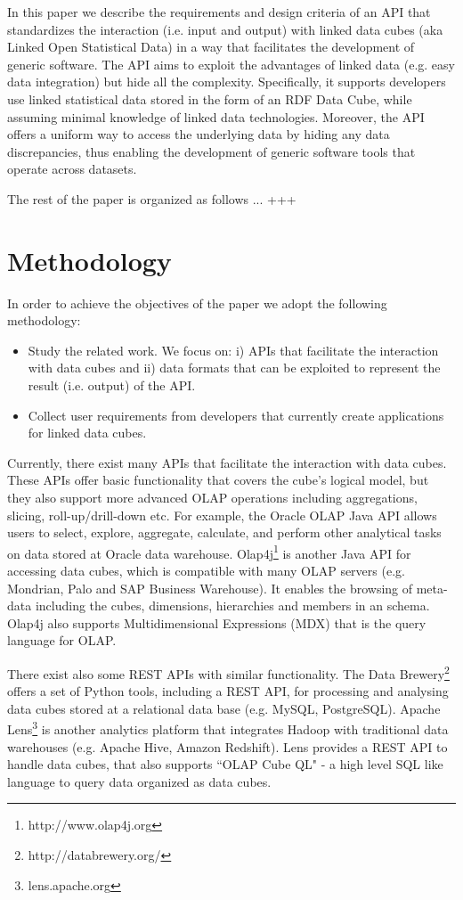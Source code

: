 \documentclass{llncs}
\begin{document}
In this paper we describe the requirements and design criteria of an API that standardizes the interaction (i.e. input and output) with linked data cubes (aka Linked Open Statistical Data) in a way that facilitates the development of generic software. The API aims to exploit the advantages of linked data (e.g. easy data integration) but hide all the complexity. Specifically, it supports developers use linked statistical data stored in the form of an RDF Data Cube, while assuming minimal knowledge of linked data technologies. Moreover, the API offers a uniform way to access the underlying data by hiding any data discrepancies, thus enabling the development of generic software tools that operate across datasets. 

The rest of the paper is organized as follows ... +++

\section{Methodology}\label{sec:methodology}

In order to achieve the objectives of the paper we adopt the following methodology:
\begin{itemize}
\item Study the related work. We focus on: i) APIs that facilitate the interaction with data cubes and ii) data formats that can be exploited to represent the result (i.e. output) of the API. 
\item Collect user requirements from developers that currently create applications for linked data cubes. 
\end{itemize}

Currently, there exist many APIs that facilitate the interaction with data cubes. These APIs offer basic functionality that covers the cube's logical model, but they also support more advanced OLAP operations including aggregations, slicing, roll-up/drill-down etc. For example, the Oracle OLAP Java API \cite{ORACLEAPI} allows users to select, explore, aggregate, calculate, and perform other analytical tasks on data stored at Oracle data warehouse. Olap4j\footnote{http://www.olap4j.org} is another Java API for accessing data cubes, which is compatible with many OLAP servers (e.g. Mondrian, Palo and SAP Business Warehouse). It enables the browsing of meta-data including the cubes, dimensions, hierarchies and members in an schema. Olap4j also supports Multidimensional Expressions (MDX) that is the query language for OLAP.

There exist also some REST APIs with similar functionality. The Data Brewery\footnote{http://databrewery.org/} offers a set of Python tools, including a REST API, for processing and analysing data cubes stored at a relational data base (e.g. MySQL, PostgreSQL). Apache Lens\footnote{lens.apache.org} is another analytics platform that integrates Hadoop with traditional data warehouses (e.g. Apache Hive, Amazon Redshift). Lens provides a REST API to handle data cubes, that also supports ``OLAP Cube QL" - a high level SQL like language to query data organized as data cubes.
\end{document}
